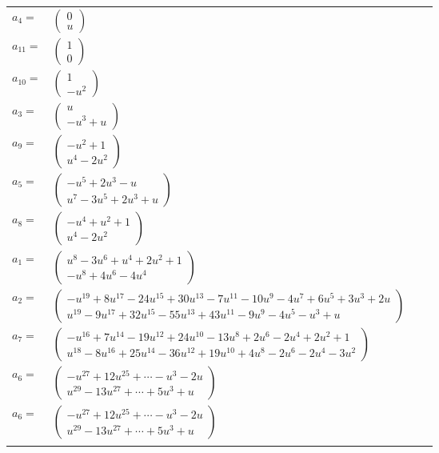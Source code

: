 \documentclass[1p]{elsarticle_modified}
\theoremstyle{definition}
\begin{document}
\begin{tabular}{m{7pt} m{180pt} m{7pt} m{180pt} }
\flushright $a_{4}=$&$\begin{pmatrix}0\\u\end{pmatrix}$ \\
\flushright $a_{11}=$&$\begin{pmatrix}1\\0\end{pmatrix}$ \\
\flushright $a_{10}=$&$\begin{pmatrix}1\\- u^2\end{pmatrix}$ \\
\flushright $a_{3}=$&$\begin{pmatrix}u\\- u^3+u\end{pmatrix}$ \\
\flushright $a_{9}=$&$\begin{pmatrix}- u^2+1\\u^4-2 u^2\end{pmatrix}$ \\
\flushright $a_{5}=$&$\begin{pmatrix}- u^5+2 u^3- u\\u^7-3 u^5+2 u^3+u\end{pmatrix}$ \\
\flushright $a_{8}=$&$\begin{pmatrix}- u^4+u^2+1\\u^4-2 u^2\end{pmatrix}$ \\
\flushright $a_{1}=$&$\begin{pmatrix}u^8-3 u^6+u^4+2 u^2+1\\- u^8+4 u^6-4 u^4\end{pmatrix}$ \\
\flushright $a_{2}=$&$\begin{pmatrix}- u^{19}+8 u^{17}-24 u^{15}+30 u^{13}-7 u^{11}-10 u^9-4 u^7+6 u^5+3 u^3+2 u\\u^{19}-9 u^{17}+32 u^{15}-55 u^{13}+43 u^{11}-9 u^9-4 u^5- u^3+u\end{pmatrix}$ \\
\flushright $a_{7}=$&$\begin{pmatrix}- u^{16}+7 u^{14}-19 u^{12}+24 u^{10}-13 u^8+2 u^6-2 u^4+2 u^2+1\\u^{18}-8 u^{16}+25 u^{14}-36 u^{12}+19 u^{10}+4 u^8-2 u^6-2 u^4-3 u^2\end{pmatrix}$ \\
\flushright $a_{6}=$&$\begin{pmatrix}- u^{27}+12 u^{25}+\cdots- u^3-2 u\\u^{29}-13 u^{27}+\cdots+5 u^3+u\end{pmatrix}$\\ \flushright $a_{6}=$&$\begin{pmatrix}- u^{27}+12 u^{25}+\cdots- u^3-2 u\\u^{29}-13 u^{27}+\cdots+5 u^3+u\end{pmatrix}$\\&\end{tabular}
\end{document}

